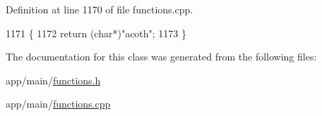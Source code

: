 Definition at line 1170 of file functions.\+cpp.


\begin{DoxyCode}
1171 \{
1172     \textcolor{keywordflow}{return} (\textcolor{keywordtype}{char}*)\textcolor{stringliteral}{"acoth"};
1173 \}
\end{DoxyCode}


The documentation for this class was generated from the following files\+:\begin{DoxyCompactItemize}
\item 
app/main/\hyperlink{functions_8h}{functions.\+h}\item 
app/main/\hyperlink{functions_8cpp}{functions.\+cpp}\end{DoxyCompactItemize}
